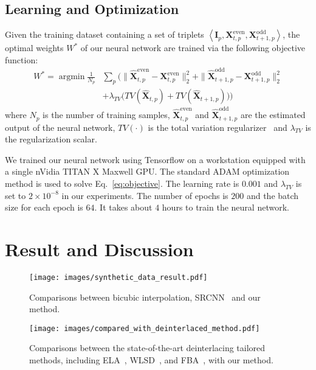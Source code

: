 \documentclass[acmtog]{acmart}
\DeclareMathOperator*{\argmin}{\arg\min}
\begin{document}
\subsection{Learning and Optimization}
Given the training dataset containing a set of triplets $\left\langle \mathbf{I}_p,\mathbf{X}^{\text{even}}_{t,p},\mathbf{X}^{\text{odd}}_{t+1,p}\right\rangle$, the optimal weights $W^*$ of our neural network are trained via the following objective function:
\begin{equation}\label{eq:objective}
\begin{split}
W^*=\argmin \frac{1}{N_p} &\sum_p \Big(\|\widehat{\mathbf{X}}^{\text{even}}_{t,p}-\mathbf{X}^{\text{even}}_{t,p}\|^2_2+\|\widehat{\mathbf{X}}^{\text{odd}}_{t+1,p}-\mathbf{X}^{\text{odd}}_{t+1,p}\|^2_2\\
&+\lambda_{TV}\big(TV(\widehat{\mathbf{X}}_{t,p})+TV(\widehat{\mathbf{X}}_{t+1,p})\big)\Big)
\end{split}
\end{equation}
where $N_p$ is the number of training samples, $\widehat{\mathbf{X}}^{\text{even}}_{t,p}$ and $\widehat{\mathbf{X}}^{\text{odd}}_{t+1,p}$ are the estimated output of the neural network, $TV(\cdot)$ is the total variation regularizer~\cite{aly2005image,johnson2016perceptual} and $\lambda_{TV}$ is the regularization scalar.


We trained our neural network using Tensorflow on a workstation equipped with a
single nVidia TITAN X Maxwell GPU. The standard ADAM
optimization method \cite{kingma2014adam} is used to solve
Eq.~\ref{eq:objective}. The learning rate is $0.001$ and $\lambda_{TV}$ is set to
$2\times10^{-8}$ in our experiments. The number of epochs is $200$ and the batch size for each
epoch is $64$. It takes about $4$ hours to train the neural network.

\section{Result and Discussion}
\begin{figure*}[!tp]
	\centering
	\texttt{[image: images/synthetic\_data\_result.pdf]}\\
	\caption{Comparisons between bicubic interpolation, SRCNN~\cite{dong2016image} and our method. 
	}\label{fig:compared_with_bicubic_and_srcnn_results}
\end{figure*}\begin{figure*}[!tp]
	\centering
	\texttt{[image: images/compared\_with\_deinterlaced\_method.pdf]}\\
	\caption{Comparisons between the state-of-the-art deinterlacing tailored methods, including ELA~\cite{doyle1990interlaced}, WLSD~\cite{wang2014interlacing}, and FBA~\cite{vedadi2013interlacing}, with our method. }\label{fig:compared_with_deinterlaced_method}
\end{figure*}
\end{document}
